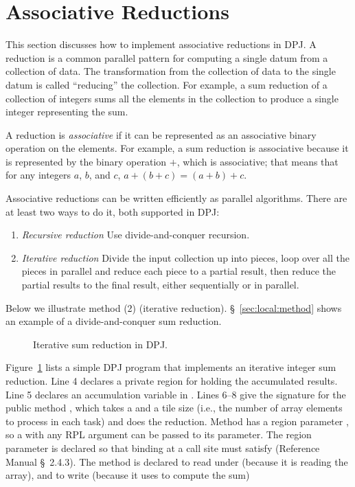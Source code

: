 \section{Associative Reductions%
\label{sec:reductions}}

This section discusses how to implement associative reductions in DPJ.
A reduction is a common parallel pattern for computing a single datum
from a collection of data.  The transformation from the collection of
data to the single datum is called ``reducing'' the collection.  For
example, a sum reduction of a collection of integers sums all the
elements in the collection to produce a single integer representing
the sum.

A reduction is \emph{associative} if it can be represented as an
associative binary operation on the elements.  For example, a sum
reduction is associative because it is represented by the binary
operation $+$, which is associative; that means that for any integers
$a$, $b$, and $c$, $a+(b+c)=(a+b)+c$.  

 Associative reductions can be
written efficiently as parallel algorithms.  There are at least two
ways to do it, both supported in DPJ:
%
\begin{enumerate}
%
\item \emph{Recursive reduction} Use divide-and-conquer recursion.
%
\item \emph{Iterative reduction} Divide the input collection up into
  pieces, loop over all the pieces in parallel and reduce each piece
  to a partial result, then reduce the partial results to the final
  result, either sequentially or in parallel.
%
\end{enumerate}
%
Below we illustrate method (2) (iterative reduction).
\S~\ref{sec:local:method} shows an example of a divide-and-conquer sum
reduction.

\begin{figure}

\caption{Iterative sum reduction in DPJ.}
\label{fig:reductions:pattern}
\end{figure}

Figure~\ref{fig:reductions:pattern} lists a simple DPJ program that
implements an iterative integer sum reduction.  Line 4 declares a
private region  for holding the accumulated results.
Line 5 declares an accumulation variable  in .
Lines 6--8 give the signature for the public method ,
which takes a  and a tile size (i.e., the number of
array elements to process in each task) and does the reduction.
Method  has a region parameter , so a
 with any RPL argument can be passed to its
 parameter.  The region parameter is declared so that binding
 at a call site must satisfy  (Reference
Manual \S~2.4.3).  The method is declared to read under 
(because it is reading the array), and to write 
(because it uses  to compute the sum)

